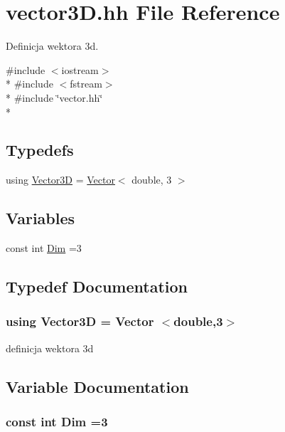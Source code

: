 \hypertarget{vector3_d_8hh}{}\section{vector3\+D.\+hh File Reference}
\label{vector3_d_8hh}


Definicja wektora 3d.  


{\ttfamily \#include $<$iostream$>$}\\*
{\ttfamily \#include $<$fstream$>$}\\*
{\ttfamily \#include \char`\"{}vector.\+hh\char`\"{}}\\*
\subsection*{Typedefs}
\begin{DoxyCompactItemize}
\item 
using \hyperlink{vector3_d_8hh_a8790ef07836c1639da216f46501979c0}{Vector3D} = \hyperlink{class_vector}{Vector}$<$ double, 3 $>$
\end{DoxyCompactItemize}
\subsection*{Variables}
\begin{DoxyCompactItemize}
\item 
const int \hyperlink{vector3_d_8hh_aebac2fc600b2b39e7ce77d58994cc0f0}{Dim} =3
\end{DoxyCompactItemize}


\subsection{Typedef Documentation}
\subsubsection[{\texorpdfstring{Vector3D}{Vector3D}}]{\setlength{\rightskip}{0pt plus 5cm}using {\bf Vector3D} =  {\bf Vector} $<$double,3$>$}\hypertarget{vector3_d_8hh_a8790ef07836c1639da216f46501979c0}{}\label{vector3_d_8hh_a8790ef07836c1639da216f46501979c0}
definicja wektora 3d 

\subsection{Variable Documentation}
\subsubsection[{\texorpdfstring{Dim}{Dim}}]{\setlength{\rightskip}{0pt plus 5cm}const int Dim =3}\hypertarget{vector3_d_8hh_aebac2fc600b2b39e7ce77d58994cc0f0}{}\label{vector3_d_8hh_aebac2fc600b2b39e7ce77d58994cc0f0}
